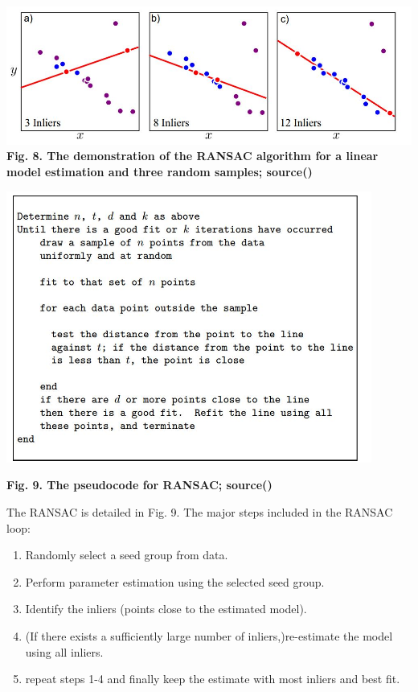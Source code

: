 \documentclass{article}
\begin{document}
\includegraphics[width=\textwidth]{ransac2.png}
\textbf{Fig. 8. The demonstration of the RANSAC algorithm for a linear model estimation and three random samples; source(\cite{prince2012computer})}


\includegraphics[width=0.9\textwidth]{ransac3.png}

\textbf{Fig. 9. The pseudocode for RANSAC; source(\cite{forsyth2011computer})}

The RANSAC is detailed in Fig. 9. The major steps included in the RANSAC loop:

\begin{enumerate}
  \item Randomly select a seed group from data.
  \item Perform parameter estimation using the selected seed group.
  \item Identify the inliers (points close to the estimated model).
  \item (If there exists a sufficiently large number of inliers,)re-estimate the model using all inliers.
  \item repeat steps 1-4 and finally keep the estimate with most inliers and best fit.
\end{enumerate}
\end{document}
